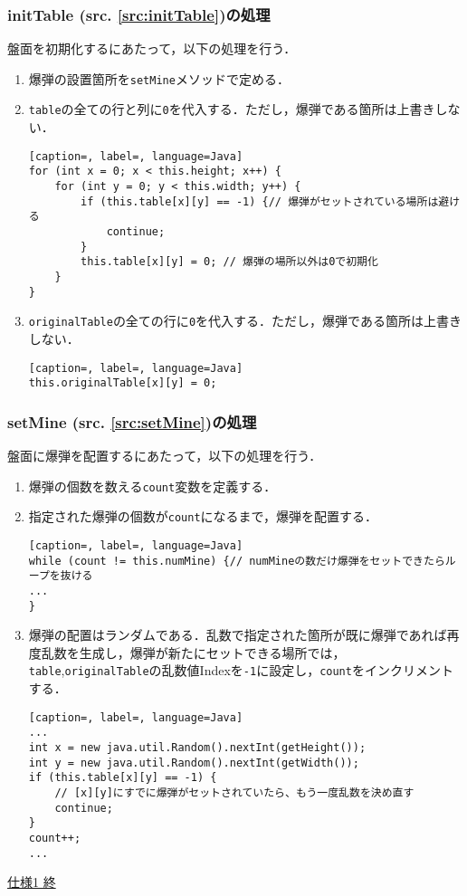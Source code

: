 \documentclass[a4j,11pt]{jsarticle}
\newcommand{\srcref}[1]{src. \ref{#1}}
\newcommand{\met}[1]{\ttfamily #1 \normalfont (\srcref{src:#1})の処理}
\begin{document}
\subsubsection*{\met{initTable}}
盤面を初期化するにあたって，以下の処理を行う．
\begin{enumerate}
    \renewcommand{\labelenumi}{\arabic{enumi})}
    \item 爆弾の設置箇所を\verb|setMine|メソッドで定める．
    \item \verb|table|の全ての行と列に\verb|0|を代入する．ただし，爆弾である箇所は上書きしない．
          \begin{lstlisting}[caption=, label=, language=Java]
for (int x = 0; x < this.height; x++) {
    for (int y = 0; y < this.width; y++) {
        if (this.table[x][y] == -1) {// 爆弾がセットされている場所は避ける
            continue;
        }
        this.table[x][y] = 0; // 爆弾の場所以外は0で初期化
    }
}
    \end{lstlisting}
    \item \verb|originalTable|の全ての行に\verb|0|を代入する．ただし，爆弾である箇所は上書きしない．
          \begin{lstlisting}[caption=, label=, language=Java]
this.originalTable[x][y] = 0;
    \end{lstlisting}
\end{enumerate}
\subsubsection*{\met{setMine}}
盤面に爆弾を配置するにあたって，以下の処理を行う．
\begin{enumerate}
    \renewcommand{\labelenumi}{\arabic{enumi})}
    \item 爆弾の個数を数える\verb|count|変数を定義する．
    \item 指定された爆弾の個数が\verb|count|になるまで，爆弾を配置する．
          \begin{lstlisting}[caption=, label=, language=Java]
while (count != this.numMine) {// numMineの数だけ爆弾をセットできたらループを抜ける
...
}
    \end{lstlisting}
    \item 爆弾の配置はランダムである．乱数で指定された箇所が既に爆弾であれば再度乱数を生成し，爆弾が新たにセットできる場所では，\verb|table|,\verb|originalTable|の乱数値Indexを\verb|-1|に設定し，\verb|count|をインクリメントする．
          \begin{lstlisting}[caption=, label=, language=Java]
...
int x = new java.util.Random().nextInt(getHeight());
int y = new java.util.Random().nextInt(getWidth());
if (this.table[x][y] == -1) {
    // [x][y]にすでに爆弾がセットされていたら、もう一度乱数を決め直す
    continue;
}
count++;
...
    \end{lstlisting}
\end{enumerate}
\begin{flushright}
    \underline{仕様1 終}
\end{flushright}
\newpage
\end{document}

